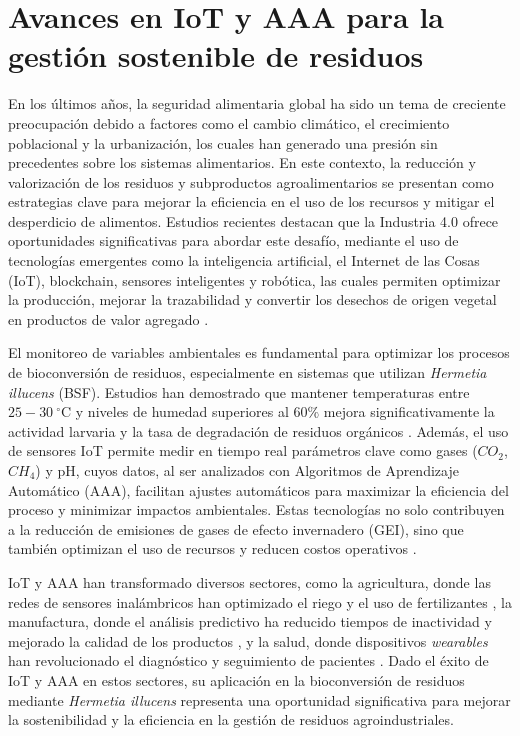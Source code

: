 \section{Avances en IoT y AAA para la gestión sostenible de residuos}

En los últimos años, la seguridad alimentaria global ha sido un tema de creciente preocupación debido a factores como el cambio climático, el crecimiento poblacional y la urbanización, los cuales han generado una presión sin precedentes sobre los sistemas alimentarios. En este contexto, la reducción y valorización de los residuos y subproductos agroalimentarios se presentan como estrategias clave para mejorar la eficiencia en el uso de los recursos y mitigar el desperdicio de alimentos. Estudios recientes destacan que la Industria 4.0 ofrece oportunidades significativas para abordar este desafío, mediante el uso de tecnologías emergentes como la inteligencia artificial, el Internet de las Cosas (IoT), blockchain, sensores inteligentes y robótica, las cuales permiten optimizar la producción, mejorar la trazabilidad y convertir los desechos de origen vegetal en productos de valor agregado \parencite{ait-kaddourTransformingPlantbasedWaste2024}.

El monitoreo de variables ambientales es fundamental para optimizar los procesos de bioconversión de residuos, especialmente en sistemas que utilizan \textit{Hermetia illucens} (BSF). Estudios han demostrado que mantener temperaturas entre $25-30\ ^{\circ}\mathrm{C}$ y niveles de humedad superiores al $60\%$ mejora significativamente la actividad larvaria y la tasa de degradación de residuos orgánicos \parencite{salamEffectDifferentEnvironmental2022}. Además, el uso de sensores IoT permite medir en tiempo real parámetros clave como gases ($CO_2$, $CH_4$) y pH, cuyos datos, al ser analizados con Algoritmos de Aprendizaje Automático (AAA), facilitan ajustes automáticos para maximizar la eficiencia del proceso y minimizar impactos ambientales. Estas tecnologías no solo contribuyen a la reducción de emisiones de gases de efecto invernadero (GEI), sino que también optimizan el uso de recursos y reducen costos operativos \parencite{liuOptimizingDataPipelines2023,vanIntegrationInternetofThingsSustainable2022}.

IoT y AAA han transformado diversos sectores, como la agricultura, donde las redes de sensores inalámbricos han optimizado el riego y el uso de fertilizantes \parencite{satputeREVIEWPAPERWIRELESS2021}, la manufactura, donde el análisis predictivo ha reducido tiempos de inactividad y mejorado la calidad de los productos \parencite{avalekarOptimizingAgriculturalEfficiency2024}, y la salud, donde dispositivos \textit{wearables} han revolucionado el diagnóstico y seguimiento de pacientes \parencite{paulMachineLearningIoT2024}. Dado el éxito de IoT y AAA en estos sectores, su aplicación en la bioconversión de residuos mediante \textit{Hermetia illucens} representa una oportunidad significativa para mejorar la sostenibilidad y la eficiencia en la gestión de residuos agroindustriales.

